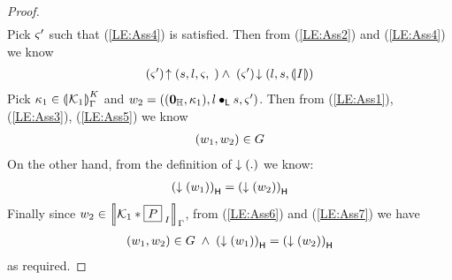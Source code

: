 \begin{lemma}[]
\begin{proof}
\begin{align}
\end{align}
%
Pick $\amod{}'$ such that (\ref{LE:Ass4}) is satisfied. Then from (\ref{LE:Ass2}) and (\ref{LE:Ass4}) we know
%
\begin{align}
	\expandsAM{\amod{}'}{s}{l}{\amod{}} \;\land\; \extendsAM{\amod{}'}{l}{s}{\intermediateSemI{I}} \label{LE:Ass5}
\end{align}
%
Pick $\ca{1} \in \semK[\lenv]{\capAss{1}}$ and $w_2 = \left( (\unitH, \ca{1}), l \composeL s, \amod{}'\right)$. Then from (\ref{LE:Ass1}), (\ref{LE:Ass3}), (\ref{LE:Ass5}) we know
%
\begin{align}
	(w_1, w_2) \in \guarantee \label{LE:Ass6}
\end{align}
%
On the other hand, from the definition of $\collapseW{.}$ we know:
\begin{align}
	\heapPart{\left(\collapseW{w_1}\right)} = \heapPart{\left(\collapseW{w_2}\right)} \label{LE:Ass7}
\end{align}
%
Finally since $w_2 \in \sem[\lenv]{\capAss{1} * \shared{P}{I}}$, from (\ref{LE:Ass6}) and (\ref{LE:Ass7}) we have
%
\begin{align}
	(w_1, w_2) \in \guarantee \;\land\; \heapPart{\left(\collapseW{w_1}\right)} = \heapPart{\left(\collapseW{w_2}\right)}
\end{align}
%
as required.
\end{proof}
\end{lemma}
